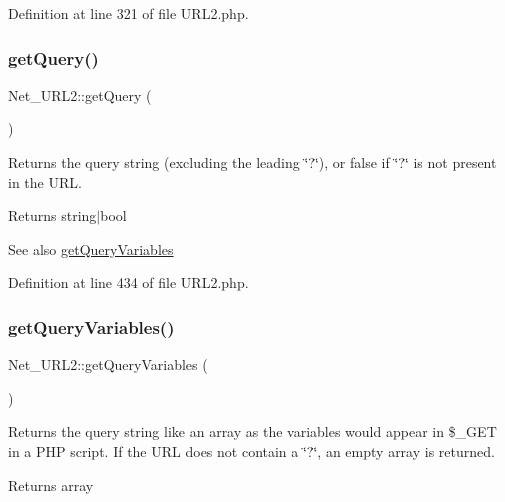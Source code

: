Definition at line 321 of file U\+R\+L2.\+php.

\mbox{\label{classNet__URL2_ab65997a75dae3ef237c80b57da4467f6}} 
\subsubsection{\texorpdfstring{get\+Query()}{getQuery()}}
{\footnotesize\ttfamily Net\+\_\+\+U\+R\+L2\+::get\+Query (\begin{DoxyParamCaption}{ }\end{DoxyParamCaption})}

Returns the query string (excluding the leading \char`\"{}?\char`\"{}), or false if \char`\"{}?\char`\"{} is not present in the U\+RL.

\begin{DoxyReturn}{Returns}
string$\vert$bool 
\end{DoxyReturn}
\begin{DoxySeeAlso}{See also}
\hyperlink{classNet__URL2_a92231f88e82f0551c1958af40f7cb88d}{get\+Query\+Variables} 
\end{DoxySeeAlso}


Definition at line 434 of file U\+R\+L2.\+php.

\mbox{\label{classNet__URL2_a92231f88e82f0551c1958af40f7cb88d}} 
\subsubsection{\texorpdfstring{get\+Query\+Variables()}{getQueryVariables()}}
{\footnotesize\ttfamily Net\+\_\+\+U\+R\+L2\+::get\+Query\+Variables (\begin{DoxyParamCaption}{ }\end{DoxyParamCaption})}

Returns the query string like an array as the variables would appear in \$\+\_\+\+G\+ET in a P\+HP script. If the U\+RL does not contain a \char`\"{}?\char`\"{}, an empty array is returned.

\begin{DoxyReturn}{Returns}
array 
\end{DoxyReturn}



